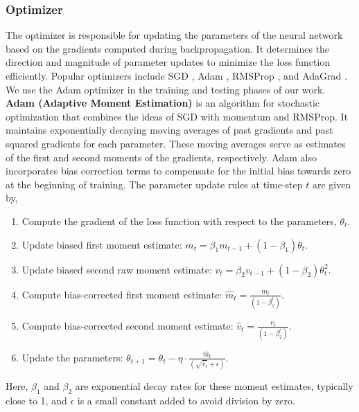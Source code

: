 \subsubsection{Optimizer} 
The optimizer is responsible for updating the parameters of the neural network based on the gradients computed during backpropagation. It determines the direction and magnitude of parameter updates to minimize the loss function efficiently. Popular optimizers include \gls{SGD} \cite{sgd}, \gls{Adam} \cite{adam}, \gls{RMSProp} \cite{rmsprop}, and \gls{AdaGrad} \cite{adagrad}. We use the Adam optimizer in the training and testing phases of our work. \\
 \textbf{Adam (Adaptive Moment Estimation)} is an algorithm for stochastic optimization that combines the ideas of SGD with momentum and RMSProp. It maintains exponentially decaying moving averages of past gradients and past squared gradients for each parameter. These moving averages serve as estimates of the first and second moments of the gradients, respectively. Adam also incorporates bias correction terms to compensate for the initial bias towards zero at the beginning of training. The parameter update rules at time-step $t$ are given by,
 \begin{enumerate}
  \item Compute the gradient of the loss function with respect to the parameters, \(\theta_t\).
  \item Update biased first moment estimate: \(m_t = \beta_1 m_{t-1} + (1 - \beta_1)\theta_t\).
  \item Update biased second raw moment estimate: \(v_t = \beta_2 v_{t-1} + (1 - \beta_2)\theta_t^2\).
  \item Compute bias-corrected first moment estimate: \(\hat{m}_t = \frac{m_t}{(1 - \beta_1^t)}\).
  \item Compute bias-corrected second moment estimate: \(\hat{v}_t = \frac{v_t}{(1 - \beta_2^t)}\).
  \item Update the parameters: \(\theta_{t+1} = \theta_t - \eta \cdot \frac{\hat{m}_t}{(\sqrt{\hat{v}_t} + \epsilon)}\).
\end{enumerate}
Here, \(\beta_1\) and \(\beta_2\) are exponential decay rates for these moment estimates, typically close to 1, and $\epsilon$ is a small constant added to avoid division by zero.
